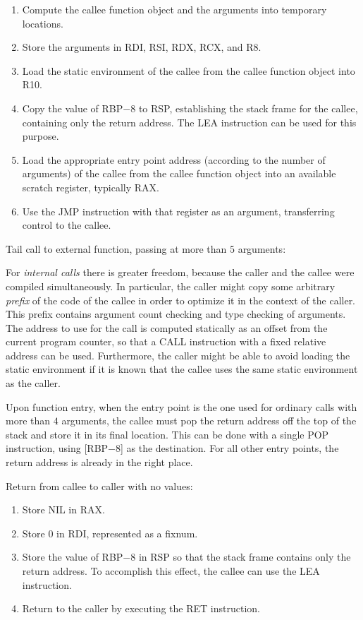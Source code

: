 \begin{enumerate}
\item Compute the callee function object and the arguments into
  temporary locations.
\item Store the arguments in RDI, RSI, RDX, RCX, and R8.
\item Load the static environment of the callee from the callee
  function object into R10.
\item Copy the value of RBP$ - 8$ to RSP, establishing the stack frame
  for the callee, containing only the return address.  The LEA
  instruction can be used for this purpose.
\item Load the appropriate entry point address (according to the
  number of arguments) of the callee from the callee function object
  into an available scratch register, typically RAX.
\item Use the JMP instruction with that register as an argument,
  transferring control to the callee.
\end{enumerate}

Tail call to external function, passing at more than $5$ arguments:%

For \emph{internal calls} there is greater freedom, because the caller
and the callee were compiled simultaneously.  In particular, the
caller might copy some arbitrary \emph{prefix} of the code of the
callee in order to optimize it in the context of the caller.  This
prefix contains argument count checking and type checking of
arguments.  The address to use for the call is computed statically as
an offset from the current program counter, so that a CALL instruction
with a fixed relative address can be used.  Furthermore, the caller
might be able to avoid loading the static environment if it is known
that the callee uses the same static environment as the caller.

Upon function entry, when the entry point is the one used for ordinary
calls with more than $4$ arguments, the callee must pop the return
address off the top of the stack and store it in its final location.
This can be done with a single POP instruction, using [RBP$ - 8$] as
the destination.   For all other entry points, the return address is
already in the right place.

Return from callee to caller with no values:

\begin{enumerate}
\item Store NIL in RAX.
\item Store $0$ in RDI, represented as a fixnum.
\item Store the value of RBP$ - 8$ in RSP so that the stack frame
  contains only the return address.  To accomplish this effect, the
  callee can use the LEA instruction.
\item Return to the caller by executing the RET instruction.
\end{enumerate}

